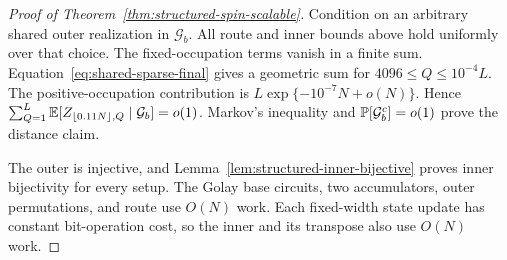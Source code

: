 \begin{proof}[Proof of Theorem~\ref{thm:structured-spin-scalable}]
Condition on an arbitrary shared outer realization in $\mathcal G_b$.
All route and inner bounds above hold uniformly over that choice.
The fixed-occupation terms vanish in a finite sum.
Equation~\eqref{eq:shared-sparse-final} gives a geometric sum for
$4096\le Q\le10^{-4}L$. The positive-occupation contribution is
$L\exp\{-10^{-7}N+o(N)\}$. Hence
$\sum_{Q=1}^L\mathbb E[Z_{\lfloor0.11N\rfloor,Q}\mid\mathcal G_b]=o(1)$.
Markov's inequality and $\mathbb P[\mathcal G_b^c]=o(1)$ prove the
distance claim.

The outer is injective, and Lemma~\ref{lem:structured-inner-bijective}
proves inner bijectivity for every setup. The Golay base circuits,
two accumulators, outer permutations, and route use $O(N)$ work.
Each fixed-width state update has constant bit-operation cost, so the
inner and its transpose also use $O(N)$ work.
\end{proof}
